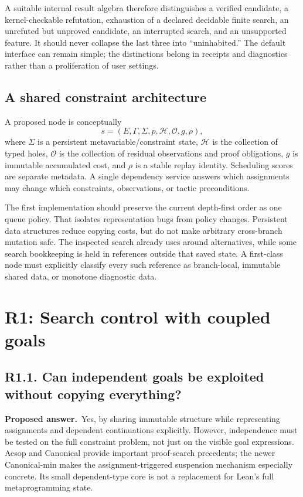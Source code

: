 \documentclass[11pt,a4paper]{article}
\newcommand{\code}[1]{\texttt{\small\detokenize{#1}}}
\newcommand{\question}[2]{\subsection{#1. #2}\label{q:#1}}
\newcommand{\answer}{\textbf{Proposed answer.}\ }
\theoremstyle{remark}
\begin{document}
A suitable internal result algebra therefore distinguishes a verified
candidate, a kernel-checkable refutation, exhaustion of a declared decidable
finite search, an unrefuted but unproved candidate, an interrupted search, and
an unsupported feature. It should never collapse the last three into
``uninhabited.'' The default interface can remain simple; the distinctions
belong in receipts and diagnostics rather than a proliferation of user
settings.

\subsection{A shared constraint architecture}

A proposed node is conceptually
\[
 s=(E,\Gamma,\Sigma,p,\mathcal H,\mathcal O,g,\rho),
\]
where $\Sigma$ is a persistent metavariable/constraint state, $\mathcal H$ is
the collection of typed holes, $\mathcal O$ is the collection of residual
observations and proof obligations, $g$ is immutable accumulated cost, and
$\rho$ is a stable replay identity. Scheduling scores are separate metadata.
A single dependency service answers which assignments may change which
constraints, observations, or tactic preconditions.

The first implementation should preserve the current depth-first order as
one queue policy. That isolates representation bugs from policy changes.
Persistent data structures reduce copying costs, but do not make arbitrary
cross-branch mutation safe. The inspected search already uses
\code{Meta.SavedState} around alternatives, while some search bookkeeping is
held in references outside that saved state. A first-class node must explicitly
classify every such reference as branch-local, immutable shared data, or
monotone diagnostic data.\cite{leantcore}

\section{R1: Search control with coupled goals}
\label{sec:r1}

\question{R1.1}{Can independent goals be exploited without copying everything?}

\answer Yes, by sharing immutable structure while representing assignments
and dependent continuations explicitly. However, independence must be tested
on the full constraint problem, not just on the visible goal expressions.
Aesop and Canonical provide important proof-search precedents; the newer
Canonical-min makes the assignment-triggered suspension mechanism especially
concrete. Its small dependent-type core is not a replacement for Lean's full
metaprogramming state.\cite{aesop,canonical,canonicalmin}
\end{document}
